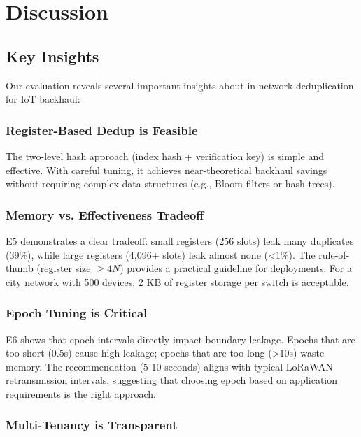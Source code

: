 \section{Discussion}
\label{sec:discussion}

\subsection{Key Insights}

Our evaluation reveals several important insights about in-network deduplication for IoT backhaul:

\subsubsection{Register-Based Dedup is Feasible}

The two-level hash approach (index hash + verification key) is simple and effective. With careful tuning, it achieves near-theoretical backhaul savings without requiring complex data structures (e.g., Bloom filters or hash trees).

\subsubsection{Memory vs. Effectiveness Tradeoff}

E5 demonstrates a clear tradeoff: small registers (256 slots) leak many duplicates (39\%), while large registers (4,096+ slots) leak almost none (<1\%). The rule-of-thumb (register size $\geq 4N$) provides a practical guideline for deployments. For a city network with 500 devices, 2 KB of register storage per switch is acceptable.

\subsubsection{Epoch Tuning is Critical}

E6 shows that epoch intervals directly impact boundary leakage. Epochs that are too short (0.5s) cause high leakage; epochs that are too long (>10s) waste memory. The recommendation (5-10 seconds) aligns with typical LoRaWAN retransmission intervals, suggesting that choosing epoch based on application requirements is the right approach.

\subsubsection{Multi-Tenancy is Transparent}

